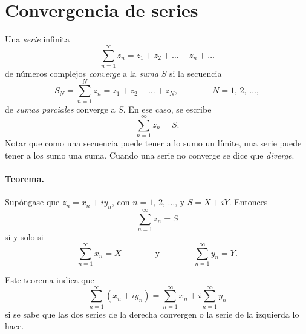 \documentclass[a4paper]{report}
\begin{document}
\section{Convergencia de series}\label{sec:convergence_of_series}

Una \emph{serie} infinita
\begin{equation}\label{eq:series_convergence_series_definition}
 \sum_{n=1}^\infty z_n=z_1+z_2+\dots+z_n+\dots 
\end{equation}
de números complejos \emph{converge} a la \emph{suma} \(S\) si la secuencia 
\begin{equation}\label{eq:series_convergence_partial_sums}
 S_N=\sum_{n=1}^N z_n=z_1+z_2+\dots+z_N,
 \qquad\qquad
 N=1,\,2,\,\dots, 
\end{equation}
de \emph{sumas parciales} converge a \(S\). En ese caso, se escribe
\[
 \sum_{n=1}^\infty z_n=S.
\]
Notar que como una secuencia puede tener a lo sumo un límite, una serie puede tener a los sumo una suma. Cuando una serie no converge se dice que \emph{diverge}.

\paragraph{Teorema.} Supóngase que \(z_n=x_n+iy_n\), con \(n=1,\,2,\,\dots\), y \(S=X+iY\). Entonces
\begin{equation}\label{eq:series_convergence_re_im_thoerm_direct}
 \sum_{n=1}^\infty z_n=S
\end{equation}
si y solo si
\begin{equation}\label{eq:series_convergence_re_im_thoerm_reciprocal}
 \sum_{n=1}^\infty x_n=X
 \qquad\qquad\textrm{y}\qquad\qquad
 \sum_{n=1}^\infty y_n=Y. 
\end{equation}

Este teorema indica que 
\[
 \sum_{n=1}^\infty(x_n+iy_n)=\sum_{n=1}^\infty x_n+i\sum_{n=1}^\infty y_n
\]
si se sabe que las dos series de la derecha convergen o la serie de la izquierda lo hace.
\end{document}
